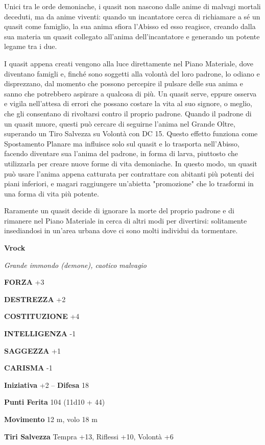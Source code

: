 \begin{multicols}{2}
	Unici tra le orde demoniache, i quasit non nascono dalle anime di malvagi mortali deceduti, ma da anime viventi: quando un incantatore cerca di richiamare a sé un quasit come famiglio, la sua anima sfiora l'Abisso ed esso reagisce, creando dalla sua materia un quasit collegato all'anima dell'incantatore e generando un potente legame tra i due.

	I quasit appena creati vengono alla luce direttamente nel Piano Materiale, dove diventano famigli e, finché sono soggetti alla volontà del loro padrone, lo odiano e disprezzano, dal momento che possono percepire il pulsare delle sua anima e sanno che potrebbero aspirare a qualcosa di più. Un quasit serve, eppure osserva e vigila nell'attesa di errori che possano costare la vita al suo signore, o meglio, che gli consentano di rivoltarsi contro il proprio padrone. Quando il padrone di un quasit muore, questi può cercare di seguirne l'anima nel Grande Oltre, superando un Tiro Salvezza su Volontà con DC 15. Questo effetto funziona come Spostamento Planare ma influisce solo sul quasit e lo trasporta nell'Abisso, facendo diventare sua l'anima del padrone, in forma di larva, piuttosto che utilizzarla per creare nuove forme di vita demoniache. In questo modo, un quasit può usare l'anima appena catturata per contrattare con abitanti più potenti dei piani inferiori, e magari raggiungere un'abietta "promozione" che lo trasformi in una forma di vita più potente.

	Raramente un quasit decide di ignorare la morte del proprio padrone e di rimanere nel Piano Materiale in cerca di altri modi per divertirsi: solitamente insediandosi in un'area urbana dove ci sono molti individui da tormentare.

	\medskip{}\textbf{Vrock}

	\textit{Grande immondo (demone), caotico malvagio}

	\textbf{FORZA} +3

	\textbf{DESTREZZA} +2

	\textbf{COSTITUZIONE} +4

	\textbf{INTELLIGENZA} -1

	\textbf{SAGGEZZA} +1

	\textbf{CARISMA} -1

	\textbf{Iniziativa} +2 -- \textbf{Difesa} 18

	\textbf{Punti Ferita} 104 (11d10 + 44)

	\textbf{Movimento} 12 m, volo 18 m

	\textbf{Tiri Salvezza} Tempra +13, Riflessi +10, Volontà +6


\end{multicols}
